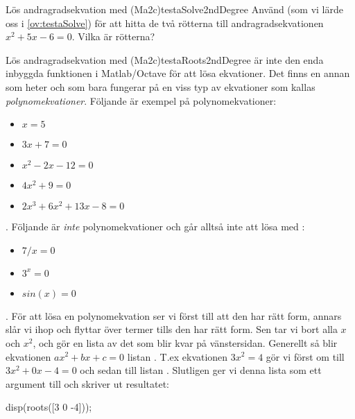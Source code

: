 \begin{matteovning}{Lös andragradsekvation med  (Ma2c)}{testaSolve2ndDegree}
Använd  (som vi lärde oss i \autoref{ov:testaSolve}) för att hitta de två rötterna till andragradsekvationen $x^2 + 5x - 6 = 0$. Vilka är rötterna?
\end{matteovning}

\begin{matteovning}{Lös andragradsekvation med  (Ma2c)}{testaRoots2ndDegree}
 är inte den enda inbyggda funktionen i Matlab/Octave för att lösa ekvationer. Det finns en annan som heter  och som bara fungerar på en viss typ av ekvationer som kallas \emph{polynomekvationer}. Följande är exempel på polynomekvationer:

\begin{itemize}
\item $x = 5$
\item $3x + 7 = 0$
\item $x^2 - 2x - 12 = 0$
\item $4x^2 + 9 = 0$
\item $2x^3 + 6x^2 + 13x - 8 = 0$
\end{itemize}

{\color{white}.}
\newline
Följande är \emph{inte} polynomekvationer och går alltså inte att lösa med :
\begin{itemize}
\item $7 / x = 0$
\item $3^x = 0$
\item $sin(x) = 0$
\end{itemize}

{\color{white}.}
\newline
För att lösa en polynomekvation ser vi först till att den har rätt form, annars slår vi ihop och flyttar över termer tills den har rätt form. Sen tar vi bort alla $x$ och $x^2$, och gör en lista av det som blir kvar på vänstersidan. Generellt så blir ekvationen $ax^2 + bx + c = 0$ listan \cw{[a b c]}. T.ex ekvationen $3x^2 = 4$ gör vi först om till $3x^2 + 0x - 4 = 0$ och sedan till listan \cw{[3 0 -4]}. Slutligen ger vi denna lista som ett argument till  och skriver ut resultatet:
\vspace{10pt}
\begin{matlab}
disp(roots([3 0 -4]));
\end{matlab}


\end{matteovning}
